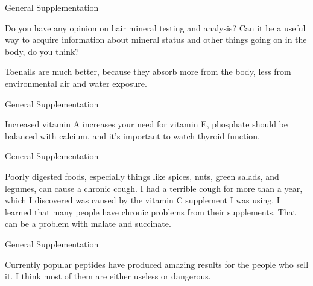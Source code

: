\documentclass[11pt,oneside,openany,extrafontsizes]{memoir}
\begin{document}
\begin{qaexchange}{General Supplementation}

    \begin{question}
        Do you have any opinion on hair mineral testing and analysis? Can it be a useful way to acquire information about mineral status and other things going on in the body, do you think?
    \end{question}

    \begin{answer}
       Toenails are much better, because they absorb more from the body, less from environmental air and water exposure. 
    \end{answer}
\end{qaexchange}

\begin{standalonequote}{General Supplementation}

    \begin{answer}
       Increased vitamin A increases your need for vitamin E, phosphate should be balanced with calcium, and it's important to watch thyroid function. 
    \end{answer}
\end{standalonequote}

\begin{standalonequote}{General Supplementation}

    \begin{answer}
       Poorly digested foods, especially things like spices, nuts, green salads, and legumes, can cause a chronic cough. I had a terrible cough for more than a year, which I discovered was caused by the vitamin C supplement I was using. I learned that many people have chronic problems from their supplements. That can be a problem with malate and succinate. 
    \end{answer}
\end{standalonequote}

\begin{standalonequote}{General Supplementation}

    \begin{answer}
      Currently popular peptides have produced amazing results for the people who sell it. I think most of them are either useless or dangerous.
    \end{answer}
\end{standalonequote}
\end{document}
